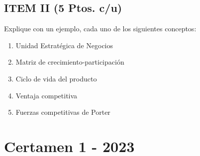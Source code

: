 \documentclass{templateNote}
\begin{document}
\newpage
\subsection*{ITEM II (5 Ptos. c/u)}
Explique con un ejemplo, cada uno de los siguientes conceptos: 

\begin{enumerate}
    \item Unidad Estratégica de Negocios
    \item Matriz de crecimiento-participación
    \item Ciclo de vida del producto
    \item Ventaja competitiva
    \item Fuerzas competitivas de Porter
\end{enumerate}

\newpage
\section{Certamen 1 - 2023} 
\end{document}
